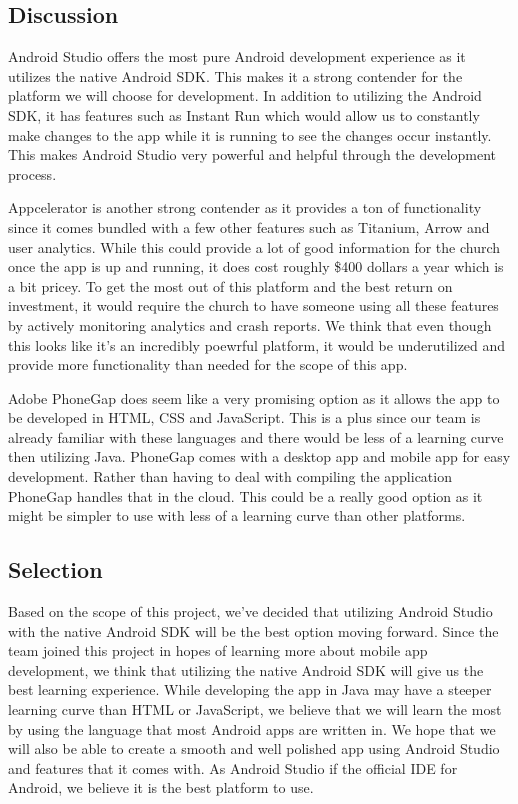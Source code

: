 \documentclass[letterpaper,10pt,draftclsnofoot,onecolumn,titlepage]{IEEEtran}
\begin{document}
		\subsection{Discussion}
			Android Studio offers the most pure Android development experience as it utilizes the native Android SDK.
			This makes it a strong contender for the platform we will choose for development.
			In addition to utilizing the Android SDK, it has features such as Instant Run which would allow us to constantly make changes to the app while it is running to see the changes occur instantly.
			This makes Android Studio very powerful and helpful through the development process.

			Appcelerator is another strong contender as it provides a ton of functionality since it comes bundled with a few other features such as Titanium, Arrow and user analytics.
			While this could provide a lot of good information for the church once the app is up and running, it does cost roughly \$400 dollars a year which is a bit pricey.
			To get the most out of this platform and the best return on investment, it would require the church to have someone using all these features by actively monitoring analytics and crash reports.
			We think that even though this looks like it's an incredibly poewrful platform, it would be underutilized and provide more functionality than needed for the scope of this app.

			Adobe PhoneGap does seem like a very promising option as it allows the app to be developed in HTML, CSS and JavaScript.
			This is a plus since our team is already familiar with these languages and there would be less of a learning curve then utilizing Java.
			PhoneGap comes with a desktop app and mobile app for easy development.
			Rather than having to deal with compiling the application PhoneGap handles that in the cloud.
			This could be a really good option as it might be simpler to use with less of a learning curve than other platforms.

		\subsection{Selection}
			Based on the scope of this project, we've decided that utilizing Android Studio with the native Android SDK will be the best option moving forward.
			Since the team joined this project in hopes of learning more about mobile app development, we think that utilizing the native Android SDK will give us the best learning experience.
			While developing the app in Java may have a steeper learning curve than HTML or JavaScript, we believe that we will learn the most by using the language that most Android apps are written in.
			We hope that we will also be able to create a smooth and well polished app using Android Studio and features that it comes with.
			As Android Studio if the official IDE for Android, we believe it is the best platform to use.
\end{document}
